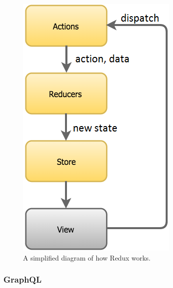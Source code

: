 \begin{figure}[H]
    \centering
    \includegraphics[scale=0.8]{figure/redux_flow.png}
    \caption{A simplified diagram of how Redux works.}
    \label{fig:reduxSumup}
\end{figure}

\subsubsection{GraphQL}
\label{sssec:grqphql}
